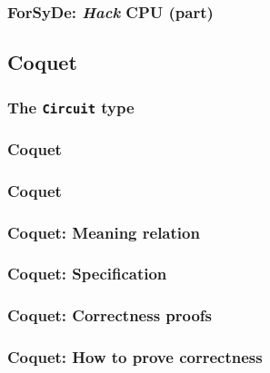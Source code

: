         \begin{frame}
            \frametitle{ForSyDe: \emph{Hack} CPU (part)}
        \end{frame}


    \subsection{Coquet}
    \label{subsec:coquet}
        \begin{frame}
            \frametitle{The \texttt{Circuit} type}
        \end{frame}

        \begin{frame}
            \frametitle{Coquet}
        \end{frame}

        \begin{frame}
            \frametitle{Coquet}
        \end{frame}

        \begin{frame}
            \frametitle{Coquet: Meaning relation}
        \end{frame}

        \begin{frame}
            \frametitle{Coquet: Specification}
        \end{frame}

        \begin{frame}
            \frametitle{Coquet: Correctness proofs}
        \end{frame}

        \begin{frame}
            \frametitle{Coquet: How to prove correctness}
        \end{frame}
